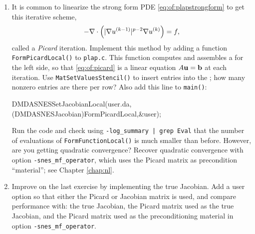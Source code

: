 \begin{enumerate}
\item \label{exer:of:picardimplementation}  It is common to linearize the strong form PDE \eqref{eq:of:plapstrongform} to get this iterative scheme,
\begin{equation}
- \nabla\cdot\left(|\nabla u^{(k-1)}|^{p-2} \nabla u^{(k)}\right) = f,
\label{eq:of:picard}
\end{equation}
called a \emph{Picard} iteration.  Implement this method by adding a function \texttt{FormPicardLocal()} to \texttt{plap.c}.  This function computes and assembles a \pMat for the left side, so that \eqref{eq:of:picard} is a linear equation $A\mathbf{u} = \mathbf{b}$ at each iteration.  Use \texttt{MatSetValuesStencil()} to insert entries into the \pMat; how many nonzero entries are there per row?  Also add this line to \texttt{main()}:
\begin{code}
    DMDASNESSetJacobianLocal(user.da,
            (DMDASNESJacobian)FormPicardLocal,&user);
\end{code}
Run the code and check using \texttt{-log\_summary | grep Eval} that the number of evaluations of \texttt{FormFunctionLocal()} is much smaller than before.  However, are you getting quadratic convergence?  Recover quadratic convergence with option \texttt{-snes\_mf\_operator}, which uses the Picard matrix as precondition ``material''; see Chapter \ref{chap:nl}.

\item \label{exer:of:jacobianimplementation}  Improve on the last exercise by implementing the true Jacobian.  Add a user option so that either the Picard or Jacobian matrix is used, and compare performance with: the true Jacobian, the Picard matrix used as the true Jacobian, and the Picard matrix used as the preconditioning material in option \texttt{-snes\_mf\_operator}.

\end{enumerate}

